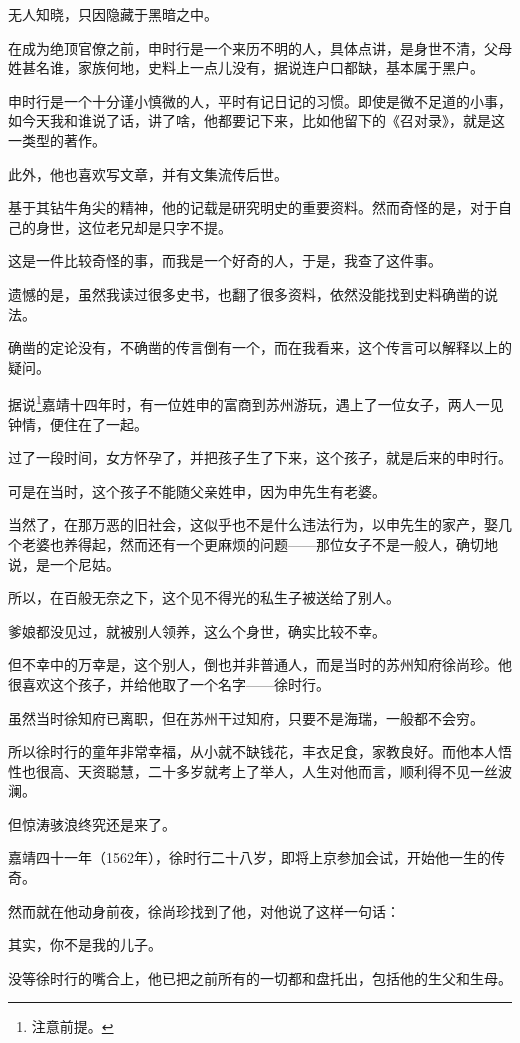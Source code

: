 \begin{multicols}{\theparacolNo}
无人知晓，只因隐藏于黑暗之中。

在成为绝顶官僚之前，申时行是一个来历不明的人，具体点讲，是身世不清，父母姓甚名谁，家族何地，史料上一点儿没有，据说连户口都缺，基本属于黑户。

申时行是一个十分谨小慎微的人，平时有记日记的习惯。即使是微不足道的小事，如今天我和谁说了话，讲了啥，他都要记下来，比如他留下的《召对录》，就是这一类型的著作。

此外，他也喜欢写文章，并有文集流传后世。

基于其钻牛角尖的精神，他的记载是研究明史的重要资料。然而奇怪的是，对于自己的身世，这位老兄却是只字不提。

这是一件比较奇怪的事，而我是一个好奇的人，于是，我查了这件事。

遗憾的是，虽然我读过很多史书，也翻了很多资料，依然没能找到史料确凿的说法。

确凿的定论没有，不确凿的传言倒有一个，而在我看来，这个传言可以解释以上的疑问。

据说\footnote{注意前提。}嘉靖十四年时，有一位姓申的富商到苏州游玩，遇上了一位女子，两人一见钟情，便住在了一起。

过了一段时间，女方怀孕了，并把孩子生了下来，这个孩子，就是后来的申时行。

可是在当时，这个孩子不能随父亲姓申，因为申先生有老婆。

当然了，在那万恶的旧社会，这似乎也不是什么违法行为，以申先生的家产，娶几个老婆也养得起，然而还有一个更麻烦的问题——那位女子不是一般人，确切地说，是一个尼姑。

所以，在百般无奈之下，这个见不得光的私生子被送给了别人。

爹娘都没见过，就被别人领养，这么个身世，确实比较不幸。

但不幸中的万幸是，这个别人，倒也并非普通人，而是当时的苏州知府徐尚珍。他很喜欢这个孩子，并给他取了一个名字——徐时行。

虽然当时徐知府已离职，但在苏州干过知府，只要不是海瑞，一般都不会穷。

所以徐时行的童年非常幸福，从小就不缺钱花，丰衣足食，家教良好。而他本人悟性也很高、天资聪慧，二十多岁就考上了举人，人生对他而言，顺利得不见一丝波澜。

但惊涛骇浪终究还是来了。

嘉靖四十一年（1562年），徐时行二十八岁，即将上京参加会试，开始他一生的传奇。

然而就在他动身前夜，徐尚珍找到了他，对他说了这样一句话：

其实，你不是我的儿子。

没等徐时行的嘴合上，他已把之前所有的一切都和盘托出，包括他的生父和生母。


\end{multicols}
